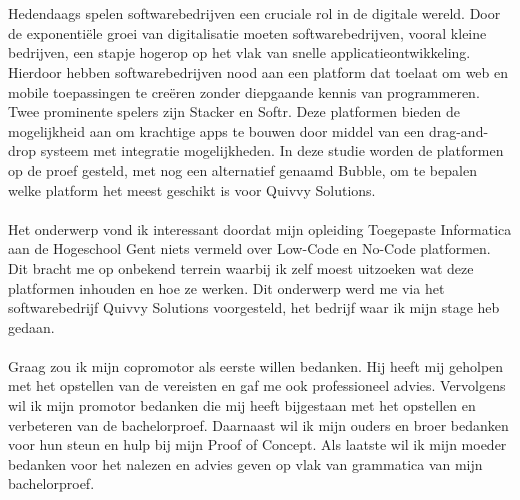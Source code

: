 
\chapter*{}%
\label{ch:voorwoord}

Hedendaags spelen softwarebedrijven een cruciale rol in de digitale wereld. 
Door de exponentiële groei van digitalisatie moeten softwarebedrijven, vooral kleine bedrijven, 
een stapje hogerop op het vlak van snelle applicatieontwikkeling. Hierdoor hebben softwarebedrijven nood aan 
een platform dat toelaat om web en mobile toepassingen te creëren zonder diepgaande kennis van programmeren. 
Twee prominente spelers zijn Stacker en Softr. Deze platformen bieden de mogelijkheid aan om krachtige apps te bouwen 
door middel van een drag-and-drop systeem met integratie mogelijkheden. In deze studie worden de platformen op de proef gesteld, 
met nog een alternatief genaamd Bubble, om te bepalen welke platform het meest geschikt is voor Quivvy Solutions.
\\
\\
Het onderwerp vond ik interessant doordat mijn opleiding Toegepaste Informatica aan de Hogeschool Gent niets vermeld over Low-Code en No-Code platformen.
Dit bracht me op onbekend terrein waarbij ik zelf moest uitzoeken wat deze platformen inhouden en hoe ze werken. Dit onderwerp werd me via 
het softwarebedrijf Quivvy Solutions voorgesteld, het bedrijf waar ik mijn stage heb gedaan.
\\
\\
Graag zou ik mijn copromotor als eerste willen bedanken. Hij heeft mij geholpen met het opstellen van de vereisten en gaf me ook
professioneel advies. Vervolgens wil ik mijn promotor bedanken die mij heeft bijgestaan met het opstellen en verbeteren van de bachelorproef. Daarnaast 
wil ik mijn ouders en broer bedanken voor hun steun en hulp bij mijn Proof of Concept. 
Als laatste wil ik mijn moeder bedanken voor het nalezen en advies geven op vlak van grammatica van mijn bachelorproef.
